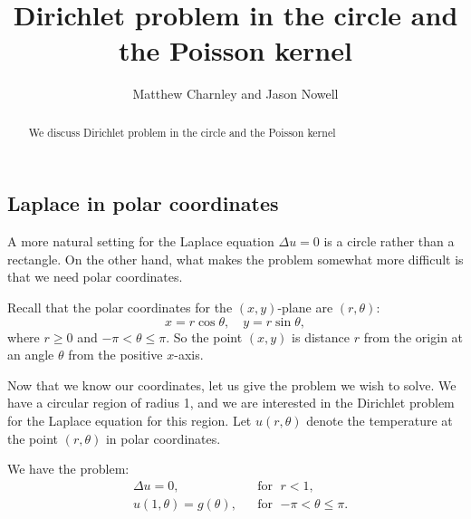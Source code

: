\documentclass{ximera}
\title{Dirichlet problem in the circle and the Poisson kernel}
\author{Matthew Charnley and Jason Nowell}
\begin{document}
\begin{abstract}
    We discuss Dirichlet problem in the circle and the Poisson kernel
\end{abstract}
\maketitle

\label{dirichdisc:section}




\subsection{Laplace in polar coordinates}

A more natural setting for the Laplace equation $\Delta u = 0$ is a circle rather than a rectangle.  On the other hand, what makes the problem somewhat more difficult is that we need polar coordinates.

\begin{mywrapfigsimp}{1.3in}{1.5in}
    \diffypdfversion{\vspace*{5pt}}
    \noindent
    
    \diffypdfversion{\vspace*{5pt}}
\end{mywrapfigsimp}
Recall that the polar coordinates for the $(x,y)$-plane are $(r,\theta)$: 
\begin{equation*}
    x = r \cos \theta , \quad y = r \sin \theta ,
\end{equation*}
where $r \geq 0$ and $-\pi < \theta \leq \pi$.  So the point $(x,y)$ is distance $r$ from the origin at an angle $\theta$ from the positive $x$-axis.

Now that we know our coordinates, let us give the problem we wish to solve.  We have a circular region of radius 1, and we are interested in the Dirichlet problem for the Laplace equation for this region.  Let $u(r,\theta)$ denote the temperature at the point $(r,\theta)$ in polar coordinates.

\begin{mywrapfigsimp}{2.4in}{2.7in}
    \noindent
    
\end{mywrapfigsimp}
We have the problem:
\begin{equation} \label{dirichdisc:theprobeq}
    \begin{aligned}
        & \Delta u = 0 , & & \text{for } \; r < 1, \\
        & u(1,\theta) = g(\theta), & & \text{for } \; {-\pi} < \theta \leq \pi.
    \end{aligned}
\end{equation}
\end{document}
